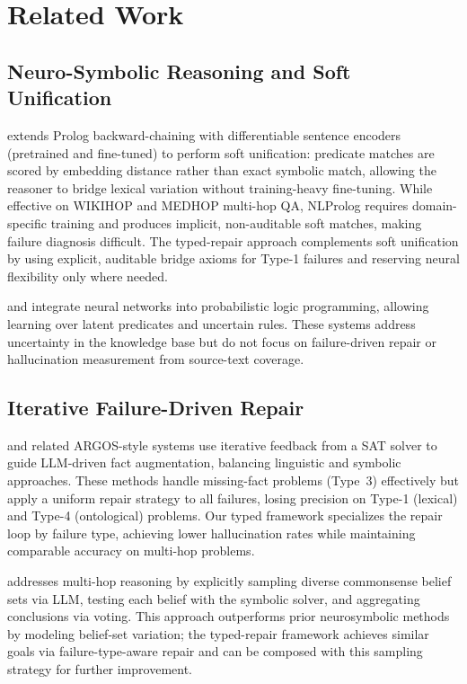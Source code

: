 \documentclass[11pt,letterpaper]{article}
\begin{document}
\section{Related Work}
\label{sec:related}

\subsection{Neuro-Symbolic Reasoning and Soft Unification}

\citet{Weber2019} extends Prolog backward-chaining with differentiable sentence
encoders (pretrained and fine-tuned) to perform soft unification: predicate matches
are scored by embedding distance rather than exact symbolic match, allowing the
reasoner to bridge lexical variation without training-heavy fine-tuning. While
effective on WIKIHOP and MEDHOP multi-hop QA, NLProlog requires domain-specific
training and produces implicit, non-auditable soft matches, making failure diagnosis
difficult. The typed-repair approach complements soft unification by using explicit,
auditable bridge axioms for Type-1 failures and reserving neural flexibility only
where needed.

\citet{Manhaeve2018} and \citet{Winters2021} integrate neural networks into
probabilistic logic programming, allowing learning over latent predicates and
uncertain rules. These systems address uncertainty in the knowledge base but do not
focus on failure-driven repair or hallucination measurement from source-text coverage.

\subsection{Iterative Failure-Driven Repair}

\citet{Olausson2023} and related ARGOS-style systems use iterative feedback from a
SAT solver to guide LLM-driven fact augmentation, balancing linguistic and symbolic
approaches. These methods handle missing-fact problems (Type~3) effectively but apply
a uniform repair strategy to all failures, losing precision on Type-1 (lexical) and
Type-4 (ontological) problems. Our typed framework specializes the repair loop by
failure type, achieving lower hallucination rates while maintaining comparable
accuracy on multi-hop problems.

\citet{Jung2022} addresses multi-hop reasoning by explicitly sampling diverse
commonsense belief sets via LLM, testing each belief with the symbolic solver, and
aggregating conclusions via voting. This approach outperforms prior neurosymbolic
methods by modeling belief-set variation; the typed-repair framework achieves similar
goals via failure-type-aware repair and can be composed with this sampling strategy
for further improvement.
\end{document}
